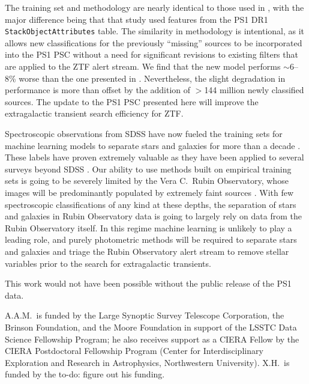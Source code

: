 \documentclass[twocolumn]{aastex63}
\newcommand{\todo}[1]{{\color{magenta} to-do: {#1}}}
\begin{document}
The training set and methodology are nearly identical to those used in
\citet{Tachibana18}, with the major difference being that that study used
features from the PS1 DR1 \texttt{StackObjectAttributes} table. The similarity
in methodology is intentional, as it allows new classifications for the
previously ``missing'' sources to be incorporated into the PS1 PSC without a
need for significant revisions to existing filters that are applied to the ZTF
alert stream. We find that the new model performs $\sim$6--8\% worse than the
one presented in \citet[][see Table~\ref{tbl:thresh}]{Tachibana18}.
Nevertheless, the slight degradation in performance is more than offset by the
addition of $>$144 million newly classified sources. The update to the PS1 PSC
presented here will improve the extragalactic transient search efficiency for
ZTF.

Spectroscopic observations from SDSS have now fueled the training sets for
machine learning models to separate stars and galaxies for more than a decade
\citep[e.g.,][]{Ball06,Beck20}. These labels have proven extremely valuable as
they have been applied to several surveys beyond SDSS
\citep[e.g.,][]{Miller17,Beck20}. Our ability to use methods built on
empirical training sets is going to be severely limited by the Vera C.\ Rubin
Observatory, whose images will be predominantly populated by extremely faint
sources \citep[$r \approx 24$\,mag;][]{Ivezic19}. With few spectroscopic
classifications of any kind at these depths, the separation of stars and
galaxies in Rubin Observatory data is going to largely rely on data from the
Rubin Observatory itself. In this regime machine learning is unlikely to play
a leading role, and purely photometric methods will be required to separate
stars and galaxies \citep[e.g.,][]{Slater20} and triage the Rubin Observatory
alert stream to remove stellar variables prior to the search for extragalactic
transients.

\acknowledgments

This work would not have been possible without the public release of the
PS1 data.

A.A.M.~is funded by the Large Synoptic Survey Telescope Corporation, the
Brinson Foundation, and the Moore Foundation in support of the LSSTC Data
Science Fellowship Program; he also receives support as a CIERA Fellow by the
CIERA Postdoctoral Fellowship Program (Center for Interdisciplinary
Exploration and Research in Astrophysics, Northwestern University). X.H.~is
funded by the \todo{figure out his funding}.
\end{document}
